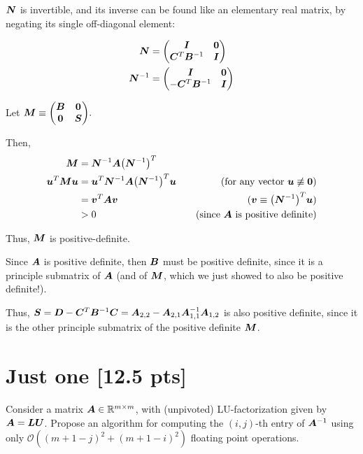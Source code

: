 \documentclass[twoside,10pt]{article}
\begin{document}
$\bm{N}$ is invertible, and its inverse can be found like an elementary real matrix, by negating its single off-diagonal element:

\begin{align*}
  \bm{N} &=
  \begin{pmatrix}
    \bm{I} & \bm{0} \\
    \bm{C}^T\bm{B}^{-1} & \bm{I}
  \end{pmatrix}\\
  \bm{N}^{-1} &=
  \begin{pmatrix}
    \bm{I} & \bm{0} \\
    -\bm{C}^T\bm{B}^{-1} & \bm{I}
  \end{pmatrix}
\end{align*}

Let $\mtx{M} \equiv \begin{pmatrix}
    \mtx{B} & \mtx{0} \\
    \mtx{0} & \mtx{S}
  \end{pmatrix}.$

Then,
\begin{align*}
  \mtx{M} &=
  \mtx{N}^{-1}\mtx{A}\left(\mtx{N}^{-1}\right)^T\\
  \vct{u}^T\mtx{M}\vct{u}
  &=
  \vct{u}^T\mtx{N}^{-1}\mtx{A}\left(\mtx{N}^{-1}\right)^T\vct{u} &\quad \text{(for any vector $\vct{u} \not\equiv \vct{0}$)}\\
  &=
  \vct{v}^T\mtx{A}\vct{v} &\quad (\vct{v} \equiv \left(\mtx{N}^{-1}\right)^T\vct{u})\\
  &> 0 &\quad \text{(since $\mtx{A}$ is positive definite)}
\end{align*}

Thus, $\bm{M}$ is positive-definite.

Since $\bm{A}$ is positive definite, then $\bm{B}$ must be positive definite, since it is a principle submatrix of $\bm{A}$ (and of $\bm{M}$, which we just showed to also be positive definite!).

Thus, $\bm{S} = \bm{D} - \bm{C}^T \bm{B}^{-1} \bm{C} = \bm{A}_{2,2} - \bm{A}_{2,1} \bm{A}_{1,1}^{-1} \bm{A}_{1,2}$ is also positive definite, since it is the other principle submatrix of the positive definite $\bm{M}$.

\section{Just one [12.5 pts]}
Consider a matrix $\bm{A} \in \mathbb{R}^{m \times m}$, with (unpivoted) LU-factorization given by $\bm{A} = \bm{L} \bm{U}$. 
Propose an algorithm for computing the $(i, j)$-th entry of $\bm{A}^{-1}$ using only $\mathcal{O}\left(\left(m + 1 - j\right)^2 + \left(m + 1 - i\right)^2\right)$ floating point operations. 
\end{document}
